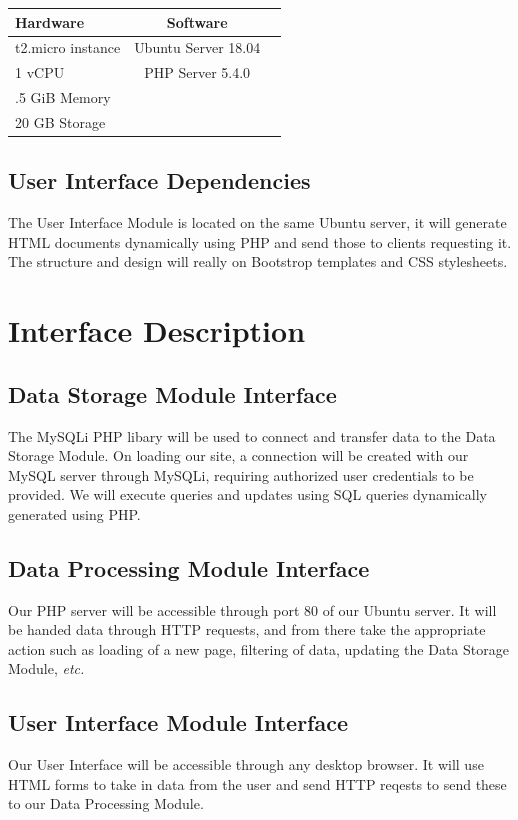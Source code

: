 \documentclass{article}
\begin{document}
\begin{center}
  \begin{tabular}{ | l | c | r |}
    \hline
    \textbf{Hardware} & \textbf{Software}\\ \hline
    t2.micro instance  &  Ubuntu Server 18.04  \\
    1 vCPU  & PHP Server 5.4.0  \\
    .5 GiB Memory  &  \\
    20 GB Storage  &  \\
    \hline
  \end{tabular}
\end{center}

\subsection{User Interface Dependencies}
The User Interface Module is located on the same Ubuntu server, it will generate HTML documents dynamically using PHP and send those to clients requesting it. The structure and design will really on Bootstrop templates and CSS stylesheets.


\section{Interface Description}

\subsection{Data Storage Module Interface}
The MySQLi PHP libary will be used to connect and transfer data to the Data Storage Module. On loading our site, a connection will be created with our MySQL server through MySQLi, requiring authorized user credentials to be provided. We will execute queries and updates using SQL queries dynamically generated using PHP.

\subsection{Data Processing Module Interface}
Our PHP server will be accessible through port 80 of our Ubuntu server. It will be handed data through HTTP requests, and from there take the appropriate action such as loading of a new page, filtering of data, updating the Data Storage Module, \emph{etc.}

\subsection{User Interface Module Interface}
Our User Interface will be accessible through any desktop browser. It will use HTML forms to take in data from the user and send HTTP reqests to send these to our Data Processing Module.  
\end{document}
